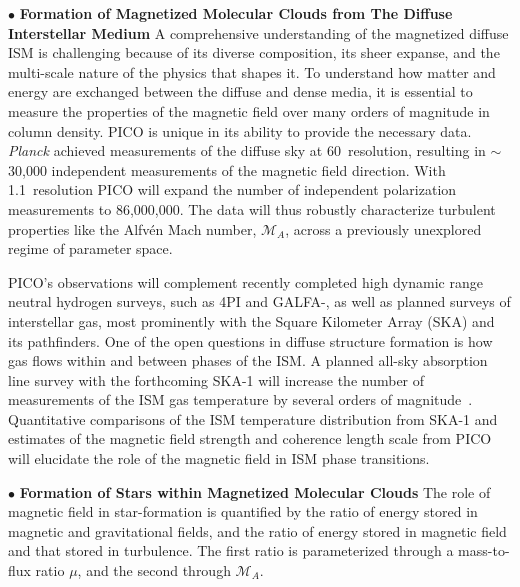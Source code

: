 \documentclass[PICOReport.tex]{subfiles}
\begin{document}
\noindent$\bullet$ {\bf Formation of Magnetized Molecular Clouds from The Diffuse Interstellar Medium} \hspace{0.1in}
A comprehensive understanding of the magnetized diffuse \ac{ISM} is challenging because of its diverse composition, its sheer expanse, and the multi-scale nature of the physics that shapes it. To understand how matter and energy are exchanged between the diffuse and dense media, it is essential to measure the properties of the magnetic field over many orders of magnitude  in column density. PICO is unique in its ability to provide the necessary data. \textit{Planck} achieved measurements of the diffuse sky at 60\arcmin\ resolution, resulting in $\sim$30,000 independent measurements of the magnetic field direction.  With 1.1\arcmin~resolution PICO will expand the number of independent polarization measurements to 86,000,000. The data will thus robustly characterize turbulent properties like the Alfv\'{e}n Mach number, $\mathcal{M}_A$, across a previously unexplored regime of parameter space. 

PICO's observations will complement recently completed high dynamic range neutral hydrogen surveys, such as \HI4PI \citep{HI4PI:2016} and GALFA-\hi \citep{Peek:2018}, as well as planned surveys of interstellar gas, most prominently with the Square Kilometer Array (SKA) and its pathfinders. One of the open questions in diffuse structure formation is how gas flows within and between phases of the \ac{ISM}. A planned all-sky absorption line survey with the forthcoming SKA-1 will increase the number of measurements of the \ac{ISM} gas temperature by several orders of magnitude~\citep{McClure-Griffiths2015}. Quantitative comparisons of the \ac{ISM} temperature distribution from SKA-1 and estimates of the magnetic field strength and coherence length scale from PICO will elucidate the role of the magnetic field in \ac{ISM} phase transitions.

\noindent$\bullet$ {\bf Formation of Stars within Magnetized Molecular Clouds} \hspace{0.1in}
The role of magnetic field in star-formation is quantified by the ratio of energy stored in magnetic and gravitational fields, and the ratio of energy stored in magnetic field and that stored in turbulence. The first ratio is parameterized through a mass-to-flux ratio $\mu$, and the second
through $\mathcal{M}_A$. 
\end{document}
